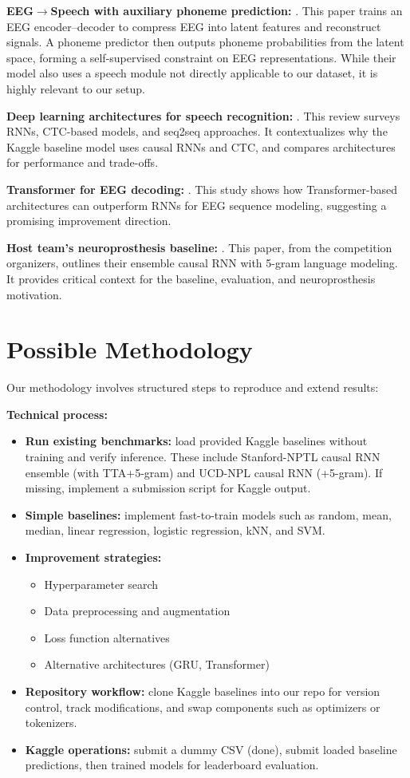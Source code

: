 \documentclass[10pt,twocolumn,letterpaper]{article}
\begin{document}
\textbf{EEG$\to$Speech with auxiliary phoneme prediction:} \cite{lee_enhancing_2025}.  
This paper trains an EEG encoder--decoder to compress EEG into latent features and reconstruct signals.  
A phoneme predictor then outputs phoneme probabilities from the latent space, forming a self-supervised constraint on EEG representations.  
While their model also uses a speech module not directly applicable to our dataset, it is highly relevant to our setup.  

\textbf{Deep learning architectures for speech recognition:} \cite{papastratis_speech_2021}.  
This review surveys RNNs, CTC-based models, and seq2seq approaches.  
It contextualizes why the Kaggle baseline model uses causal RNNs and CTC, and compares architectures for performance and trade-offs.  

\textbf{Transformer for EEG decoding:} \cite{lee_eeg-transformer_2021}.  
This study shows how Transformer-based architectures can outperform RNNs for EEG sequence modeling, suggesting a promising improvement direction.  

\textbf{Host team’s neuroprosthesis baseline:} \cite{card_accurate_2024}.  
This paper, from the competition organizers, outlines their ensemble causal RNN with 5-gram language modeling.  
It provides critical context for the baseline, evaluation, and neuroprosthesis motivation.  

\section{Possible Methodology}
Our methodology involves structured steps to reproduce and extend results:  

\textbf{Technical process:}
\begin{itemize}
    \item \textbf{Run existing benchmarks:} load provided Kaggle baselines without training and verify inference.  
    These include Stanford-NPTL causal RNN ensemble (with TTA+5-gram) and UCD-NPL causal RNN (+5-gram).  
    If missing, implement a submission script for Kaggle output.  
    \item \textbf{Simple baselines:} implement fast-to-train models such as random, mean, median, linear regression, logistic regression, kNN, and SVM.  
    \item \textbf{Improvement strategies:} 
    \begin{itemize}
        \item Hyperparameter search  
        \item Data preprocessing and augmentation  
        \item Loss function alternatives  
        \item Alternative architectures (GRU, Transformer)  
    \end{itemize}
    \item \textbf{Repository workflow:} clone Kaggle baselines into our repo for version control, track modifications, and swap components such as optimizers or tokenizers.  
    \item \textbf{Kaggle operations:} submit a dummy CSV (done), submit loaded baseline predictions, then trained models for leaderboard evaluation.  
\end{itemize}
\end{document}
